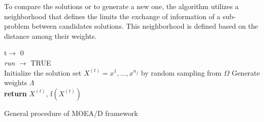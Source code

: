 To compare the solutions or to generate a new one, the algorithm utilizes a neighborhood that defines the limits the exchange of information of a sub-problem between candidates solutions. This neighborhood is defined based on the distance among their weights.



\IncMargin{1em}
\begin{algorithm}
\LinesNumbered
	t$\rightarrow$ 0\\
	\textit{run} $\rightarrow$ TRUE\\
	Initialize the solution set $ X^{(t)} =  {x^1, ..., x^{n_{f}}}$ by random sampling from $\Omega$
	Generate weights $\Lambda$\\
	\textbf{return} 	$X^{(t)}$, f$(X^{(t)})$
	\caption{General procedure of MOEA/D framework}
\end{algorithm}\DecMargin{1em}


